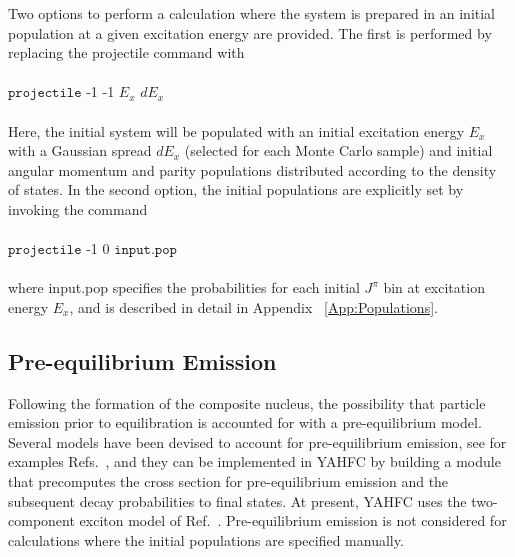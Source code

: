 \documentclass[
10pt,
showpacs,preprintnumbers,footinbib,
amsfonts,amsmath,amssymb,
aps,
prc,twocolumn,groupedaddress,superscriptaddress,
showkeys,
nofootinbib
]{revtex4-1}
\begin{document}
Two options to perform a calculation where the system is prepared in an initial population at a given excitation energy are provided. The first is performed by replacing the projectile command with\\
\\
${\texttt{projectile}}$ -1  -1 $E_x$  $dE_x$\\
\\
Here, the initial system will be populated with an initial excitation energy $E_x$ with a Gaussian spread $dE_x$ (selected for each Monte Carlo sample) and initial angular momentum and parity populations distributed according to the density of states. In the second option, the initial populations are explicitly set by invoking the command\\
\\
${\texttt{projectile}}$ -1  0  ${\texttt{input.pop}}$\\
\\
where input.pop specifies the probabilities for each initial $J^\pi$ bin at excitation energy $E_x$, and is described in detail in Appendix ~\ref{App:Populations}.

\subsection{Pre-equilibrium Emission}
\label{sec:Preeq}

Following the formation of the composite nucleus, the possibility that particle emission prior to equilibration is accounted for with a pre-equilibrium model. Several models have been devised to account for pre-equilibrium emission, see for examples Refs.~\cite{Gadioli:1992,Blann:1996,Koning:2004},  and they can be implemented in YAHFC by building a module that precomputes the cross section for pre-equilibrium emission and the subsequent decay probabilities to final states.  At present, YAHFC uses the two-component exciton model of Ref.~\cite{Koning:2004}. Pre-equilibrium emission is not considered for calculations where the initial populations are specified manually.
\end{document}
